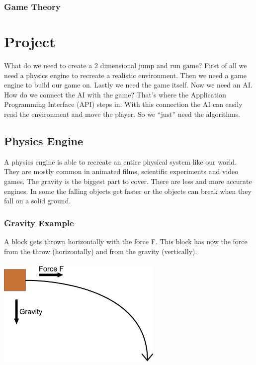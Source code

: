 \documentclass[DIV=calc, paper=a4, fontsize=11pt, twocolumn]{scrreprt}	 %
\begin{document}
        \subsection{Game Theory}

        \chapter{Project}

        What do we need to create a 2 dimensional jump and run game? First of all we need a physics engine to recreate a realistic environment. Then we need a game engine to build our game on. Lastly we need the game itself.
        Now we need an AI. How do we connect the AI with the game? That's where the Application Programming Interface (API) steps in. With this connection the AI can easily read the environment and move the player. So we ``just'' need the algorithms.

        \section{Physics Engine}
        A physics engine is able to recreate an entire physical system like our world. They are mostly common in animated films, scientific experiments and video games. The gravity is the biggest part to cover. There are less and more accurate engines. In some the falling objects get faster or the objects can break when they fall on a solid ground.

        \subsection{Gravity Example}
        A block gets thrown horizontally with the force F. This block has now the force from the throw (horizontally) and from the gravity (vertically).\\\\
        \includegraphics{images/gravity_example1.png}
\end{document}
